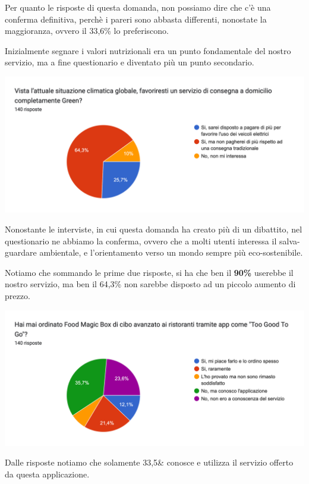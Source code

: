 \documentclass{article}
\begin{document}
Per quanto le risposte di questa domanda, non possiamo dire che c'è una conferma definitiva, perchè i pareri sono abbasta differenti, nonostate la maggioranza, ovvero il 33,6\% lo preferiscono. \par
Inizialmente segnare i valori nutrizionali era un punto fondamentale del nostro servizio, ma a fine questionario e diventato più un punto secondario.\par \vspace{1cm}
\includegraphics[width=\textwidth]{Data/Grafici/situazione_climatica.png}\par
Nonostante le interviste, in cui questa domanda ha creato più di un dibattito, nel questionario ne abbiamo la conferma, ovvero che a molti utenti interessa il salva-guardare ambientale, e l'orientamento verso un mondo sempre più eco-sostenibile.\par Notiamo che sommando le prime due risposte, si ha che ben il \textbf{90\%} userebbe il nostro servizio, ma ben il 64,3\% non sarebbe disposto ad un piccolo aumento di prezzo. \par \vspace{1cm}
\includegraphics[width=\textwidth]{Data/Grafici/too_good_too_go.png}\par
Dalle risposte notiamo che solamente 33,5\& conosce e utilizza il servizio offerto da questa applicazione.\par
\end{document}
